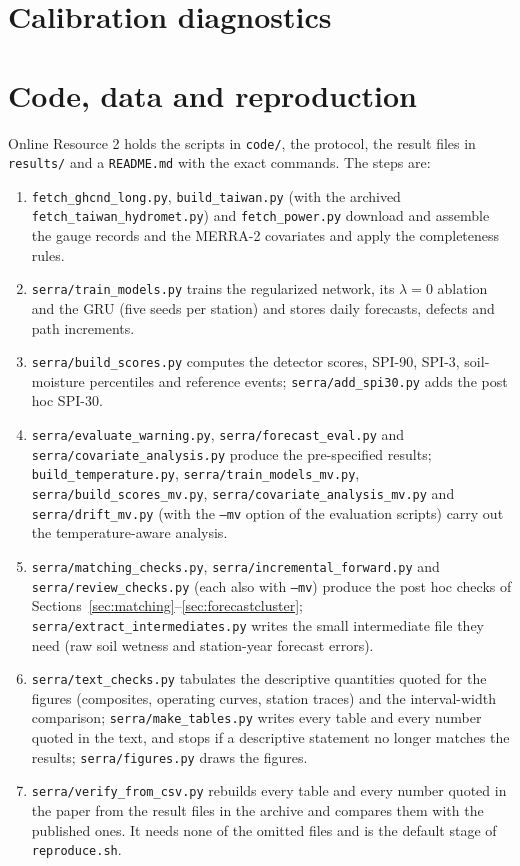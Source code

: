 \documentclass[pdflatex,sn-mathphys-ay]{sn-jnl}
\begin{document}
\section{Calibration diagnostics}\label{sec:calib}

\FloatBarrier

\section{Code, data and reproduction}\label{sec:code}
Online Resource 2 holds the scripts in \texttt{code/}, the protocol, the result files in
\texttt{results/} and a \texttt{README.md} with the exact commands. The steps are:
\begin{enumerate}
\item \texttt{fetch\_ghcnd\_long.py}, \texttt{build\_taiwan.py} (with the archived
\texttt{fetch\_taiwan\_hydromet.py}) and \texttt{fetch\_power.py} download and assemble the gauge records
and the MERRA-2 covariates and apply the completeness rules.
\item \texttt{serra/train\_models.py} trains the regularized network, its $\lambda=0$ ablation and the
GRU (five seeds per station) and stores daily forecasts, defects and path increments.
\item \texttt{serra/build\_scores.py} computes the detector scores, SPI-90, SPI-3, soil-moisture
percentiles and reference events; \texttt{serra/add\_spi30.py} adds the post hoc SPI-30.
\item \texttt{serra/evaluate\_warning.py}, \texttt{serra/forecast\_eval.py} and
\texttt{serra/covariate\_analysis.py} produce the pre-specified results; \texttt{build\_temperature.py},
\texttt{serra/train\_models\_mv.py}, \texttt{serra/build\_scores\_mv.py}, \texttt{serra/covariate\_analysis\_mv.py}
and \texttt{serra/drift\_mv.py} (with the \texttt{--mv} option of the evaluation scripts) carry out the
temperature-aware analysis.
\item \texttt{serra/matching\_checks.py}, \texttt{serra/incremental\_forward.py} and
\texttt{serra/review\_checks.py} (each also with \texttt{--mv}) produce the post hoc checks of
Sections~\ref{sec:matching}--\ref{sec:forecastcluster}; \texttt{serra/extract\_intermediates.py} writes the
small intermediate file they need (raw soil wetness and station-year forecast errors).
\item \texttt{serra/text\_checks.py} tabulates the descriptive quantities quoted for the figures
(composites, operating curves, station traces) and the interval-width comparison;
\texttt{serra/make\_tables.py} writes every table and every number quoted in the text, and stops if a
descriptive statement no longer matches the results; \texttt{serra/figures.py} draws the figures.
\item \texttt{serra/verify\_from\_csv.py} rebuilds every table and every number quoted in the paper from
the result files in the archive and compares them with the published ones. It needs none of the omitted
files and is the default stage of \texttt{reproduce.sh}.
\end{enumerate}
\end{document}
